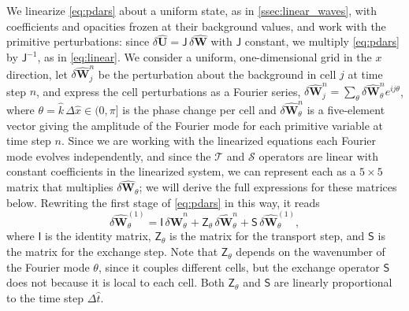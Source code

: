 \documentclass[preprint,12pt,authoryear]{elsarticle}
\newcommand{\tenS}{\mathsf{S}}
\newcommand{\tenI}{\mathsf{I}}
\newcommand{\tenZ}{\mathsf{Z}}
\newcommand{\tenJ}{\mathsf{J}}
\newcommand{\hatt}{\hat{t}}
\newcommand{\hk}{\hat{k}}
\newcommand{\hx}{\hat{x}}
\newcommand{\hvecU}{{\hat{\mathbf{U}}}}
\newcommand{\hvecW}{{\hat{\mathbf{W}}}}
\begin{document}
We linearize \autoref{eq:pdars} about a uniform state, as in \autoref{ssec:linear_waves}, with coefficients and opacities frozen at their background values, and work with the primitive perturbations: since $\delta\hvecU = \tenJ\,\delta\hvecW$ with $\tenJ$ constant, we multiply \autoref{eq:pdars} by $\tenJ^{-1}$, as in \autoref{eq:linear}. We consider a uniform, one-dimensional grid in the $x$ direction, let $\delta\hvecW_j^n$ be the perturbation about the background in cell $j$ at time step $n$, and express the cell perturbations as a Fourier series, $\delta\hvecW^n_j = \sum_\theta \delta\hvecW^n_\theta e^{ij\theta}$, where $\theta = \hk\,\Delta\hx \in (0, \pi]$ is the phase change per cell and $\delta\hvecW^n_\theta$ is a five-element vector giving the amplitude of the Fourier mode for each primitive variable at time step $n$. Since we are working with the linearized equations each Fourier mode evolves independently, and since the $\mathcal{T}$ and $\mathcal{S}$ operators are linear with constant coefficients in the linearized system, we can represent each as a $5\times 5$ matrix that multiplies $\delta\hvecW_\theta$; we will derive the full expressions for these matrices below. Rewriting the first stage of \autoref{eq:pdars} in this way, it reads
\begin{equation}
    \delta\hvecW_\theta^{(1)} = \mathsf{I} \, \delta\hvecW_\theta^n + \tenZ_\theta \, \delta \hvecW_\theta^n + \tenS \, \delta\hvecW_\theta^{(1)},
\end{equation}
where $\tenI$ is the identity matrix, $\tenZ_\theta$ is the matrix for the transport step, and $\tenS$ is the matrix for the exchange step. Note that $\tenZ_\theta$ depends on the wavenumber of the Fourier mode $\theta$, since it couples different cells, but the exchange operator $\mathsf{S}$ does not because it is local to each cell. Both $\mathsf{Z}_\theta$ and $\mathsf{S}$ are linearly proportional to the time step $\Delta \hatt$.
\end{document}
